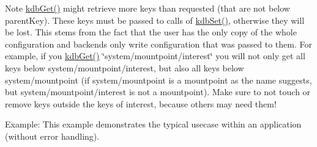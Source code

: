 \begin{DoxyNote}{Note}
\mbox{\hyperlink{group__kdb_ga28e385fd9cb7ccfe0b2f1ed2f62453a1}{kdb\+Get()}} might retrieve more keys than requested (that are not below parent\+Key). These keys must be passed to calls of \mbox{\hyperlink{group__kdb_ga11436b058408f83d303ca5e996832bcf}{kdb\+Set()}}, otherwise they will be lost. This stems from the fact that the user has the only copy of the whole configuration and backends only write configuration that was passed to them. For example, if you \mbox{\hyperlink{group__kdb_ga28e385fd9cb7ccfe0b2f1ed2f62453a1}{kdb\+Get()}} \char`\"{}system/mountpoint/interest\char`\"{} you will not only get all keys below system/mountpoint/interest, but also all keys below system/mountpoint (if system/mountpoint is a mountpoint as the name suggests, but system/mountpoint/interest is not a mountpoint). Make sure to not touch or remove keys outside the keys of interest, because others may need them!
\end{DoxyNote}
\begin{DoxyParagraph}{Example\+:}
This example demonstrates the typical usecase within an application (without error handling).
\end{DoxyParagraph}

